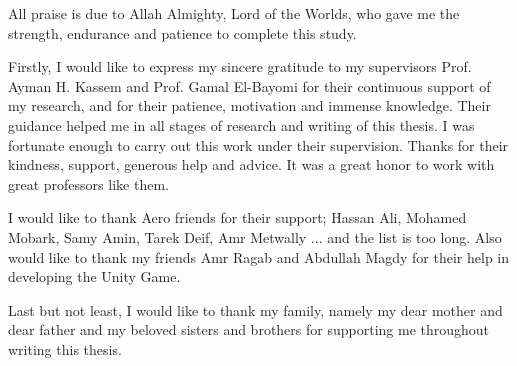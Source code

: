 All praise is due to Allah Almighty, Lord of the Worlds, who gave me the strength, endurance and patience to complete this study.

Firstly, I would like to express my sincere gratitude to my supervisors Prof. Ayman H. Kassem and Prof. Gamal El-Bayomi for their continuous support of my research, and for their patience, motivation and immense knowledge. Their guidance helped me in all stages of research and writing of this thesis. I was fortunate enough to carry out this work under their supervision. Thanks for their kindness, support, generous help and advice. It was a great honor to work with great professors like them.

I would like to thank Aero friends for their support; Hassan Ali, Mohamed Mobark, Samy Amin, Tarek Deif, Amr Metwally ... and the list is too long.
Also would like to thank my friends Amr Ragab and Abdullah Magdy for their help in developing the Unity Game.
 
Last but not least, I would like to thank my family, namely my dear mother and dear father and my beloved sisters and brothers for supporting me throughout writing this thesis.




